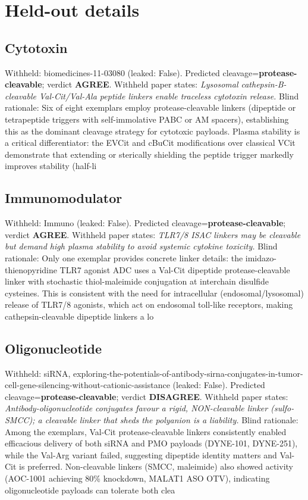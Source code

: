\documentclass[10pt]{article}
\begin{document}
\section{Held-out details}
\subsection{Cytotoxin}
Withheld: biomedicines-11-03080 (leaked: False). Predicted cleavage=\textbf{protease-cleavable}; verdict \textbf{AGREE}. Withheld paper states: \emph{Lysosomal cathepsin-B-cleavable Val-Cit/Val-Ala peptide linkers enable traceless cytotoxin release.} Blind rationale: Six of eight exemplars employ protease-cleavable linkers (dipeptide or tetrapeptide triggers with self-immolative PABC or AM spacers), establishing this as the dominant cleavage strategy for cytotoxic payloads. Plasma stability is a critical differentiator: the EVCit and cBuCit modifications over classical VCit demonstrate that extending or sterically shielding the peptide trigger markedly improves stability (half-li
\subsection{Immunomodulator}
Withheld: Immuno (leaked: False). Predicted cleavage=\textbf{protease-cleavable}; verdict \textbf{AGREE}. Withheld paper states: \emph{TLR7/8 ISAC linkers may be cleavable but demand high plasma stability to avoid systemic cytokine toxicity.} Blind rationale: Only one exemplar provides concrete linker details: the imidazo-thienopyridine TLR7 agonist ADC uses a Val-Cit dipeptide protease-cleavable linker with stochastic thiol-maleimide conjugation at interchain disulfide cysteines. This is consistent with the need for intracellular (endosomal/lysosomal) release of TLR7/8 agonists, which act on endosomal toll-like receptors, making cathepsin-cleavable dipeptide linkers a lo
\subsection{Oligonucleotide}
Withheld: siRNA, exploring-the-potentials-of-antibody-sirna-conjugates-in-tumor-cell-gene-silencing-without-cationic-assistance (leaked: False). Predicted cleavage=\textbf{protease-cleavable}; verdict \textbf{DISAGREE}. Withheld paper states: \emph{Antibody-oligonucleotide conjugates favour a rigid, NON-cleavable linker (sulfo-SMCC); a cleavable linker that sheds the polyanion is a liability.} Blind rationale: Among the exemplars, Val-Cit protease-cleavable linkers consistently enabled efficacious delivery of both siRNA and PMO payloads (DYNE-101, DYNE-251), while the Val-Arg variant failed, suggesting dipeptide identity matters and Val-Cit is preferred. Non-cleavable linkers (SMCC, maleimide) also showed activity (AOC-1001 achieving 80\% knockdown, MALAT1 ASO OTV), indicating oligonucleotide payloads can tolerate both clea
\end{document}
